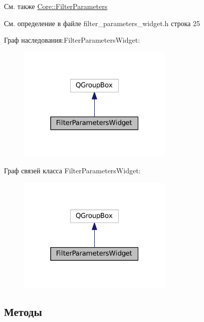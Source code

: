 \begin{DoxySeeAlso}{См. также}
\hyperlink{class_core_1_1_filter_parameters}{Core\+::\+Filter\+Parameters} 
\end{DoxySeeAlso}


См. определение в файле filter\+\_\+parameters\+\_\+widget.\+h строка 25



Граф наследования\+:Filter\+Parameters\+Widget\+:
\nopagebreak
\begin{figure}[H]
\begin{center}
\leavevmode
\includegraphics[width=211pt]{class_filter_parameters_widget__inherit__graph}
\end{center}
\end{figure}


Граф связей класса Filter\+Parameters\+Widget\+:
\nopagebreak
\begin{figure}[H]
\begin{center}
\leavevmode
\includegraphics[width=211pt]{class_filter_parameters_widget__coll__graph}
\end{center}
\end{figure}


\subsection{Методы}
\hypertarget{class_filter_parameters_widget_aac02d00c8d38c893f046e160765ded10}{}\label{class_filter_parameters_widget_aac02d00c8d38c893f046e160765ded10} 

